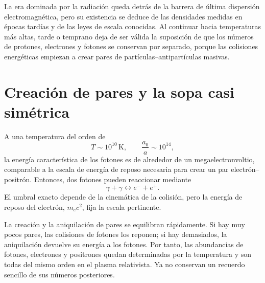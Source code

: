 La era dominada por la radiación queda detrás de la barrera de última dispersión electromagnética, pero su existencia se deduce de las densidades medidas en épocas tardías y de las leyes de escala conocidas. Al continuar hacia temperaturas más altas, tarde o temprano deja de ser válida la suposición de que los números de protones, electrones y fotones se conservan por separado, porque las colisiones energéticas empiezan a crear pares de partículas--antipartículas masivas.

\begin{classroomqa}
\end{classroomqa}

\section{Creación de pares y la sopa casi simétrica}

A una temperatura del orden de
\begin{equation}
T\sim10^{10}\,\mathrm{K},
\qquad
\frac{a_0}{a}\sim10^{14},
\end{equation}
la energía característica de los fotones es de alrededor de un megaelectronvoltio, comparable a la escala de energía de reposo necesaria para crear un par electrón--positrón. Entonces, dos fotones pueden reaccionar mediante
\begin{equation}
\gamma+\gamma
\longleftrightarrow
e^-+e^+.
\label{eq:c07-pair-reaction}
\end{equation}
El umbral exacto depende de la cinemática de la colisión, pero la energía de reposo del electrón, \(m_ec^2\), fija la escala pertinente.

La creación y la aniquilación de pares se equilibran rápidamente. Si hay muy pocos pares, las colisiones de fotones los reponen; si hay demasiados, la aniquilación devuelve su energía a los fotones. Por tanto, las abundancias de fotones, electrones y positrones quedan determinadas por la temperatura y son todas del mismo orden en el plasma relativista. Ya no conservan un recuerdo sencillo de sus números posteriores.

